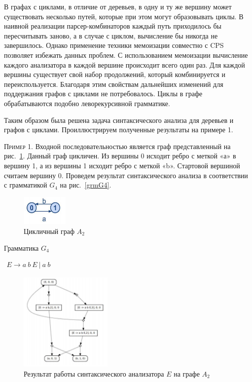 В графах с циклами, в отличие от деревьев, в одну и ту же вершину может существовать несколько путей, которые при этом могут образовывать циклы. В наивной реализации парсер-комбинаторов каждый путь приходилось бы пересчитывать заново, а в случае с циклом, вычисление бы никогда не завершилось. Однако применение техники мемоизации совместно с CPS позволяет избежать данных проблем. С использованием мемоизации вычисление каждого анализатора в каждой вершине происходит всего один раз. Для каждой вершины существует свой набор продолжений, который комбинируется и переиспользуется. Благодаря этим свойствам дальнейших изменений для поддержания графов с циклами не потребовалось. Циклы в графе обрабатываются подобно леворекурсивной грамматике.

Таким образом была решена задача синтаксического анализа для
деревьев и графов с циклами. Проиллюстрируем полученные результаты на примере 1.

\textsc{Пример 1.} 
Входной последовательностью является граф представленный на рис.~\ref{Graph2}. Данный граф цикличен. Из вершины 0 исходит
ребро с меткой «а» в вершину 1, а из вершины 1 исходит ребро с меткой «b». Стартовой вершиной считаем вершину 0. Проведем результат
синтаксического анализа в соответствии с грамматикой $G_4$ на рис.~\ref{grmG4}.

\begin{figure}
 \centering
 \includegraphics[width=0.2\textwidth]{Smolina/pics/Graph2.png}
 \caption{Цикличный граф $A_2$}
 \label{Graph2}
\end{figure}

\begin{listing}
\caption{Грамматика $G_4$}
\label{grmG4}
\centering
$\begin{array}{rl}
E \rightarrow a \ b \ E \ | \ a \ b
\end{array}$
 \end{listing}

\begin{figure}
 \centering
 \includegraphics[width=0.4\textwidth]{Smolina/pics/Tree1.png}
 \caption{Результат работы синтаксического анализатора $E$ на
графе $A_2$}
 \label{Tree1}
\end{figure}

